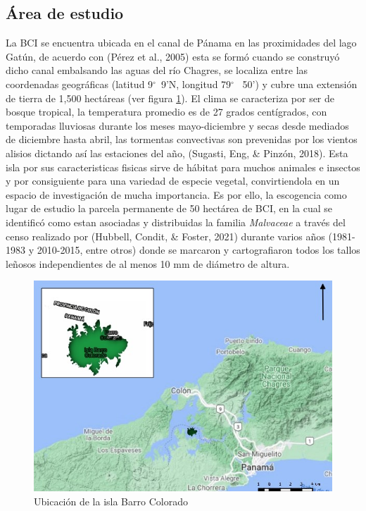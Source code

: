 \documentclass[11pt,]{article}
\begin{document}
\subsection{Área de estudio}\label{uxe1rea-de-estudio}

La BCI se encuentra ubicada en el canal de Pánama en las proximidades
del lago Gatún, de acuerdo con (Pérez et al., 2005) esta se formó cuando
se construyó dicho canal embalsando las aguas del río Chagres, se
localiza entre las coordenadas geográficas (latitud 9\(^\circ\)~9'N,
longitud 79\(^\circ\)~ 50') y cubre una extensión de tierra de 1,500
hectáreas (ver figura \ref{mapa}). El clima se caracteriza por ser de
bosque tropical, la temperatura promedio es de 27 grados centígrados,
con temporadas lluviosas durante los meses mayo-diciembre y secas desde
mediados de diciembre hasta abril, las tormentas convectivas son
prevenidas por los vientos alisios dictando así las estaciones del año,
(Sugasti, Eng, \& Pinzón, 2018). Esta isla por sus caracteristicas
fisicas sirve de hábitat para muchos animales e insectos y por
consiguiente para una variedad de especie vegetal, convirtiendola en un
espacio de investigación de mucha importancia. Es por ello, la
escogencia como lugar de estudio la parcela permanente de 50 hectárea de
BCI, en la cual se identificó como estan asociadas y distribuidas la
familia \emph{Malvaceae} a través del censo realizado por (Hubbell,
Condit, \& Foster, 2021) durante varios años (1981-1983 y 2010-2015,
entre otros) donde se marcaron y cartografiaron todos los tallos leñosos
independientes de al menos 10 mm de diámetro de altura.

\begin{figure}
\centering
\includegraphics{mapa_barro_colorado.jpeg}
\caption{Ubicación de la isla Barro Colorado\label{mapa}}
\end{figure}
\end{document}

